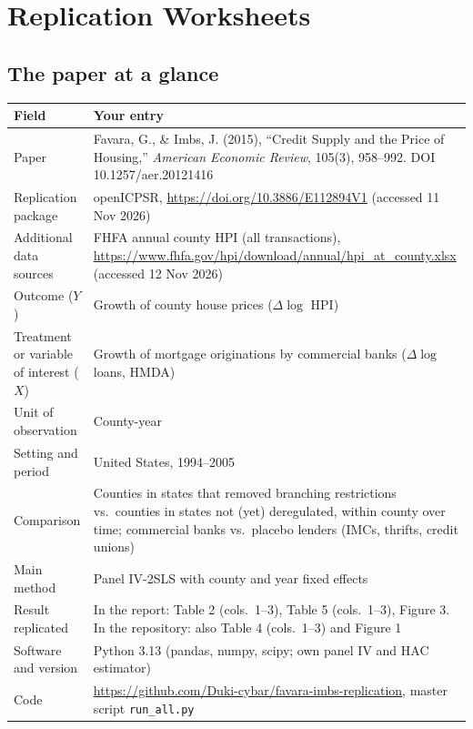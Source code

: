 \documentclass[12pt,a4paper]{article}
\renewcommand{\arraystretch}{1.25}
\begin{document}
\clearpage
\appendix
\section{Replication Worksheets}

\subsection{The paper at a glance}

{\renewcommand{\arraystretch}{1.4}%
\begin{tabularx}{\textwidth}{@{}>{\raggedright\arraybackslash}p{}L@{}}
\toprule
Field & Your entry \\
\midrule
Paper & Favara, G., \& Imbs, J. (2015), ``Credit Supply and the Price of Housing,'' \textit{American Economic Review}, 105(3), 958--992. DOI 10.1257/aer.20121416 \\
Replication package & openICPSR, \url{https://doi.org/10.3886/E112894V1} (accessed 11 Nov 2026) \\
Additional data sources & FHFA annual county HPI (all transactions), \url{https://www.fhfa.gov/hpi/download/annual/hpi_at_county.xlsx} (accessed 12 Nov 2026) \\
Outcome ($Y$) & Growth of county house prices ($\Delta\log$ HPI) \\
Treatment or variable of interest ($X$) & Growth of mortgage originations by commercial banks ($\Delta\log$ loans, HMDA) \\
Unit of observation & County-year \\
Setting and period & United States, 1994--2005 \\
Comparison & Counties in states that removed branching restrictions vs.\ counties in states not (yet) deregulated, within county over time; commercial banks vs.\ placebo lenders (IMCs, thrifts, credit unions) \\
Main method & Panel IV-2SLS with county and year fixed effects \\
Result replicated & In the report: Table 2 (cols.\ 1--3), Table 5 (cols.\ 1--3), Figure 3. In the repository: also Table 4 (cols.\ 1--3) and Figure 1 \\
Software and version & Python 3.13 (pandas, numpy, scipy; own panel IV and HAC estimator) \\
Code & \url{https://github.com/Duki-cybar/favara-imbs-replication}, master script \texttt{run\_all.py} \\
\bottomrule
\end{tabularx}}
\end{document}
